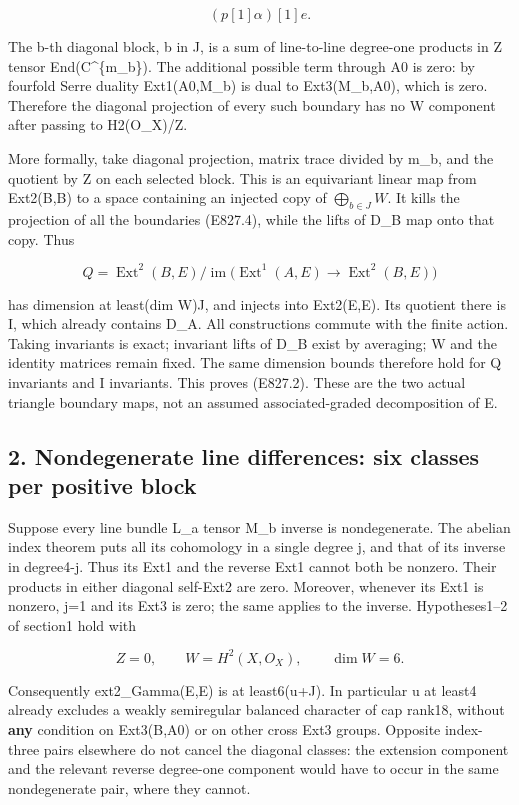 \[
 (p[1]\alpha)[1]e.
 \tag{E827.4}
\]

The b-th diagonal block, b in J, is a sum of line-to-line degree-one
products in Z tensor End(C\^{}\{m\_b\}). The additional possible term
through A0 is zero: by fourfold Serre duality Ext1(A0,M\_b) is dual to
Ext3(M\_b,A0), which is zero. Therefore the diagonal projection of every
such boundary has no W component after passing to H2(O\_X)/Z.

More formally, take diagonal projection, matrix trace divided by m\_b, and
the quotient by Z on each selected block. This is an equivariant linear map
from Ext2(B,B) to a space containing an injected copy of
\(\bigoplus_{b\in J}W\). It kills the projection of all the boundaries
(E827.4), while the lifts of D\_B map onto that copy. Thus

\[
 Q=\operatorname{Ext}^2(B,E)\big/\operatorname{im}
     \bigl(\operatorname{Ext}^1(A,E)\to\operatorname{Ext}^2(B,E)\bigr)
 \tag{E827.5}
\]

has dimension at least(dim W)\textbar J\textbar, and injects into Ext2(E,E).
Its quotient there is I, which already contains D\_A. All constructions
commute with the finite action. Taking invariants is exact; invariant lifts
of D\_B exist by averaging; W and the identity matrices remain fixed. The
same dimension bounds therefore hold for Q invariants and I invariants. This
proves (E827.2). These are the two actual triangle boundary maps, not an
assumed associated-graded decomposition of E.

\subsection{2. Nondegenerate line differences: six classes per positive
block}\label{SF-E827:nondegenerate-line-differences-six-classes-per-positive-block}

Suppose every line bundle L\_a tensor M\_b inverse is nondegenerate. The
abelian index theorem puts all its cohomology in a single degree j, and that
of its inverse in degree4-j. Thus its Ext1 and the reverse Ext1 cannot both
be nonzero. Their products in either diagonal self-Ext2 are zero. Moreover,
whenever its Ext1 is nonzero, j=1 and its Ext3 is zero; the same applies to
the inverse. Hypotheses1--2 of section1 hold with

\[
 Z=0,\qquad W=H^2(X,O_X),\qquad\dim W=6.
 \tag{E827.6}
\]

Consequently ext2\_Gamma(E,E) is at least6(u+\textbar J\textbar). In
particular u at least4 already excludes a weakly semiregular balanced
character of cap rank18, without \textbf{any} condition on Ext3(B,A0) or on
other cross Ext3 groups. Opposite index-three pairs elsewhere do not cancel
the diagonal classes: the extension component and the relevant reverse
degree-one component would have to occur in the same nondegenerate pair,
where they cannot.

